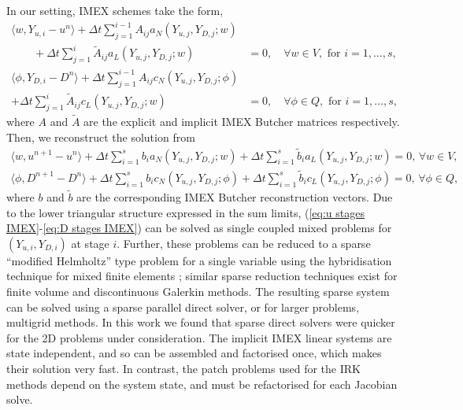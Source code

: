\documentclass[a4paper, 12pt]{article}
\begin{document}
In our setting, IMEX schemes take the form,
\begin{align}
    \nonumber
    \langle w, Y_{u,i}-u^n \rangle + \Delta t \sum_{j=1}^{i-1} A_{ij} a_N\left(
    Y_{u,j}, Y_{D,j}; w\right) & \\
\qquad    + \Delta t \sum_{j=1}^i \tilde{A}_{ij} a_L(Y_{u,j}, Y_{D,j}; w)
    & = 0, \label{eq:u stages IMEX}
  \quad \forall w \in V,\mbox{ for }i=1,\ldots,s, \\
  \nonumber
    \langle \phi, Y_{D,i}-D^n \rangle + \Delta t \sum_{j=1}^{i-1} A_{ij} c_N\left(
    Y_{u,j}, Y_{D,j}; \phi\right) & \\
    + \Delta t \sum_{j=1}^i \tilde{A}_{ij} c_L(Y_{u,j}, Y_{D,j}; w)
    & = 0, \label{eq:D stages IMEX}
      \quad \forall \phi \in Q,\mbox{ for }i=1,\ldots,s,
\end{align}
where $A$ and $\tilde{A}$ are the explicit and implicit IMEX Butcher
matrices respectively. Then, we reconstruct the solution from
\begin{align}
  \langle w, u^{n+1} - u^n\rangle + \Delta t\sum_{i=1}^s b_i
  a_N(Y_{u,j}, Y_{D,j}; w)
  + \Delta t \sum_{i=1}^s \tilde{b}_i
  a_L(Y_{u,j}, Y_{D,j}; w)=0,\, \forall w \in V, \\
    \langle \phi, D^{n+1} - D^n\rangle + \Delta t\sum_{i=1}^s b_i
  c_N(Y_{u,j}, Y_{D,j}; \phi)
  + \Delta t \sum_{i=1}^s \tilde{b}_i
    c_L(Y_{u,j}, Y_{D,j}; \phi)=0,\, \forall \phi \in Q,
\end{align}
where $b$ and $\tilde{b}$ are the corresponding IMEX Butcher
reconstruction vectors. Due to the lower triangular structure
expressed in the sum limits, (\ref{eq:u stages IMEX}-\ref{eq:D stages
  IMEX}) can be solved as single coupled mixed problems for
$(Y_{u,i},Y_{D,i})$ at stage $i$. Further, these problems can be
reduced to a sparse ``modified Helmholtz'' type problem for a single
variable using the hybridisation technique for mixed finite elements
\citep{boffi2013mixed,cockburn2004characterization}; similar sparse
reduction techniques exist for finite volume and discontinuous
Galerkin methods. The resulting sparse system can be solved using a
sparse parallel direct solver, or for larger problems, multigrid
methods. In this work we found that sparse direct solvers were quicker
for the 2D problems under consideration. The implicit IMEX linear
systems are state independent, and so can be assembled and factorised
once, which makes their solution very fast. In contrast, the patch
problems used for the IRK methods depend on the system state, and must
be refactorised for each Jacobian solve.
\end{document}
